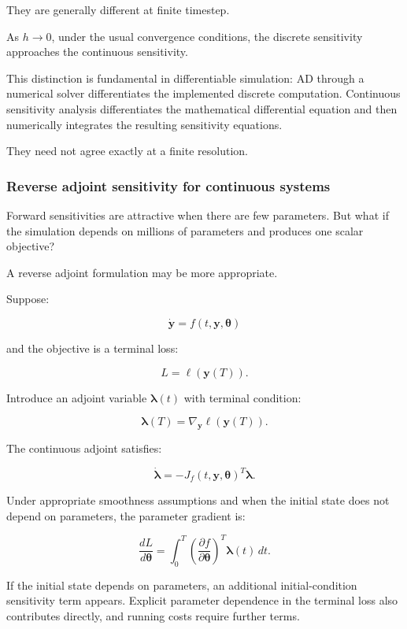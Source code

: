 They are generally different at finite timestep.

As \(h\to0\), under the usual convergence conditions, the discrete sensitivity approaches the continuous sensitivity.

This distinction is fundamental in differentiable simulation: AD through a numerical solver differentiates the implemented discrete computation. Continuous sensitivity analysis differentiates the mathematical differential equation and then numerically integrates the resulting sensitivity equations.

They need not agree exactly at a finite resolution.

\subsubsection{Reverse adjoint sensitivity for continuous systems}\label{02-foundations-ii-ch022-reverse-adjoint-sensitivity-for-continuous-systems}

\hypertarget{02-foundations-ii-ch022-reverse-adjoint-sensitivity-for-continuous-systems}{}

Forward sensitivities are attractive when there are few parameters. But what if the simulation depends on millions of parameters and produces one scalar objective?

A reverse adjoint formulation may be more appropriate.

Suppose:

\[
\dot{\mathbf y}=f(t,\mathbf y,\boldsymbol\theta)
\]

and the objective is a terminal loss:

\[
L=\ell(\mathbf y(T)).
\]

Introduce an adjoint variable \(\boldsymbol\lambda(t)\) with terminal condition:

\[
\boxed{ \boldsymbol\lambda(T)= \nabla_{\mathbf y}\ell(\mathbf y(T)) }.
\]

The continuous adjoint satisfies:

\[
\boxed{ \dot{\boldsymbol\lambda} = -J_f(t,\mathbf y,\boldsymbol\theta)^T \boldsymbol\lambda }.
\]

Under appropriate smoothness assumptions and when the initial state does not depend on parameters, the parameter gradient is:

\[
\boxed{ \frac{dL}{d\boldsymbol\theta} = \int_0^T \left(\frac{\partial f}{\partial\boldsymbol\theta}\right)^T \boldsymbol\lambda(t)\,dt }.
\]

If the initial state depends on parameters, an additional initial-condition sensitivity term appears. Explicit parameter dependence in the terminal loss also contributes directly, and running costs require further terms.

